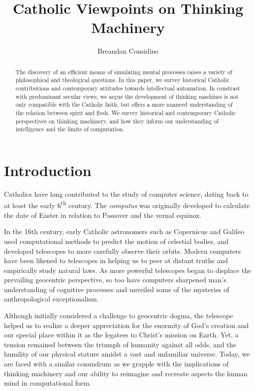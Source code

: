 \documentclass[sigplan,nonacm]{acmart}\settopmatter{printfolios=false,printccs=false,printacmref=false}
\begin{document}
  \title{Catholic Viewpoints on Thinking Machinery}
  \begin{abstract}
  The discovery of an efficient means of simulating mental processes raises a variety of philosophical and theological questions. In this paper, we survey historical Catholic contributions and contemporary attitudes towards intellectual automation. In constrast with predominant secular views, we argue the development of thinking machines is not only compatible with the Catholic faith, but offers a more nuanced understanding of the relation between spirit and flesh. We survey historical and contemporary Catholic perspectives on thinking machinery, and how they inform our understanding of intelligence and the limits of computation.
  \end{abstract}

  \author{Breandan Considine}

  \maketitle

  \section{Introduction}

  Catholics have long contributed to the study of computer science, dating back to at least the early 6\textsuperscript{th} century. The \textit{computus} was originally developed to calculate the date of Easter in relation to Passover and the vernal equinox.

  In the 16th century, early Catholic astronomers such as Copernicus and Galileo used computational methods to predict the motion of celestial bodies, and developed telescopes to more carefully observe their orbits. Modern computers have been likened to telescopes in helping us to peer at distant truths and empirically study natural laws. As more powerful telescopes began to displace the prevailing geocentric perspective, so too have computers sharpened man's understanding of cognitive processes and unveiled some of the mysteries of anthropological exceptionalism.

  Although initially considered a challenge to geocentric dogma, the telescope helped us to realize a deeper appreciation for the enormity of God's creation and our special place within it as the legatees to Christ's mission on Earth. Yet, a tension remained between the triumph of humanity against all odds, and the humility of our physical stature amidst a vast and unfamiliar universe. Today, we are faced with a similar conundrum as we grapple with the implications of thinking machinery and our ability to reimagine and recreate aspects the human mind in computational form.
\end{document}
